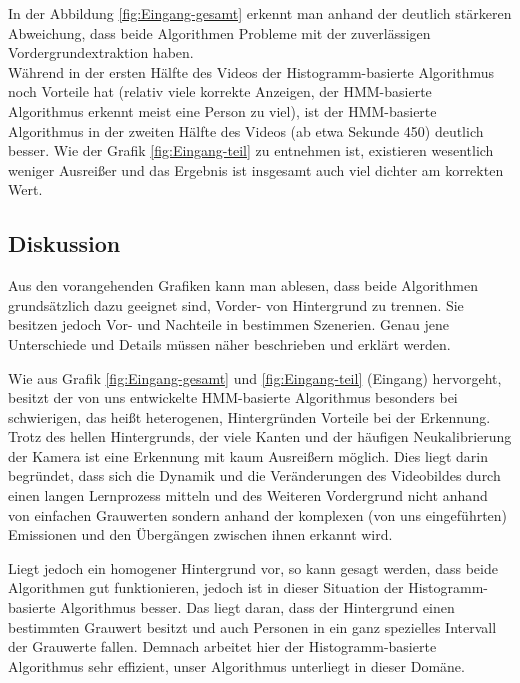 In der Abbildung \ref{fig:Eingang-gesamt} erkennt man anhand der deutlich stärkeren Abweichung, dass beide Algorithmen Probleme mit der zuverlässigen Vordergrundextraktion haben.\\
Während in der ersten Hälfte des Videos der Histogramm-basierte Algorithmus noch Vorteile hat (relativ viele korrekte Anzeigen, der HMM-basierte Algorithmus erkennt meist eine Person zu viel), ist der HMM-basierte Algorithmus in der zweiten Hälfte des Videos (ab etwa Sekunde 450) deutlich besser. Wie der Grafik \ref{fig:Eingang-teil} zu entnehmen ist, existieren wesentlich weniger Ausreißer und das Ergebnis ist insgesamt auch viel dichter am korrekten Wert.\\

\subsection{Diskussion}
\label{sec:diskuss}
Aus den vorangehenden Grafiken kann man ablesen, dass beide Algorithmen grundsätzlich dazu geeignet sind, Vorder- von Hintergrund zu trennen. Sie besitzen jedoch Vor- und Nachteile in bestimmen Szenerien. Genau jene Unterschiede und Details müssen näher beschrieben und erklärt werden.

Wie aus Grafik \ref{fig:Eingang-gesamt} und \ref{fig:Eingang-teil} (Eingang) hervorgeht, besitzt der von uns entwickelte HMM-basierte Algorithmus besonders bei schwierigen, das heißt heterogenen, Hintergründen Vorteile bei der Erkennung. Trotz des hellen Hintergrunds, der viele Kanten und der häufigen Neukalibrierung der Kamera ist eine Erkennung mit kaum Ausreißern möglich. Dies liegt darin begründet, dass sich die Dynamik und die Veränderungen des Videobildes durch einen langen Lernprozess mitteln und des Weiteren Vordergrund nicht anhand von einfachen Grauwerten sondern anhand der komplexen (von uns eingeführten) Emissionen und den Übergängen zwischen ihnen erkannt wird.

Liegt jedoch ein homogener Hintergrund vor, so kann gesagt werden, dass beide Algorithmen gut funktionieren, jedoch ist in dieser Situation der Histogramm-basierte Algorithmus besser. Das liegt daran, dass der Hintergrund einen bestimmten Grauwert besitzt und auch Personen in ein ganz spezielles Intervall der Grauwerte fallen. Demnach arbeitet hier der Histogramm-basierte Algorithmus sehr effizient, unser Algorithmus unterliegt in dieser Domäne.

